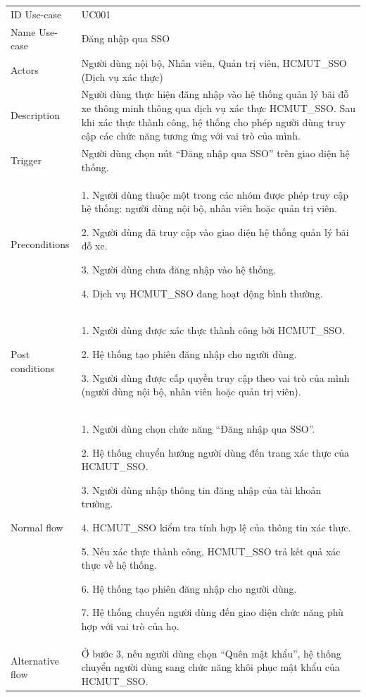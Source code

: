 \begin{center}
    \begin{tabular}{|m{2.5cm}|m{13cm}|}
    \hline
        ID Use-case  & UC001 \\ 
        Name Use-case & Đăng nhập qua SSO \\ 
    \hline
        Actors & Người dùng nội bộ, Nhân viên, Quản trị viên, HCMUT\_SSO (Dịch vụ xác thực)\\
    \hline
        Description & Người dùng thực hiện đăng nhập vào hệ thống quản lý bãi đỗ xe thông minh thông qua dịch vụ xác thực HCMUT\_SSO. Sau khi xác thực thành công, hệ thống cho phép người dùng truy cập các chức năng tương ứng với vai trò của mình. \\
    \hline
        Trigger & Người dùng chọn nút “Đăng nhập qua SSO” trên giao diện hệ thống.\\
    \hline
        Preconditions & 
        1. Người dùng thuộc một trong các nhóm được phép truy cập hệ thống: người dùng nội bộ, nhân viên hoặc quản trị viên.
        
        2. Người dùng đã truy cập vào giao diện hệ thống quản lý bãi đỗ xe.
        
        3. Người dùng chưa đăng nhập vào hệ thống.
        
        4. Dịch vụ HCMUT\_SSO đang hoạt động bình thường.\\
    \hline
        Post conditions & 
        1. Người dùng được xác thực thành công bởi HCMUT\_SSO.
        
        2. Hệ thống tạo phiên đăng nhập cho người dùng.
        
        3. Người dùng được cấp quyền truy cập theo vai trò của mình (người dùng nội bộ, nhân viên hoặc quản trị viên).\\
    \hline
        Normal flow & 
        1. Người dùng chọn chức năng “Đăng nhập qua SSO”.
        
        2. Hệ thống chuyển hướng người dùng đến trang xác thực của HCMUT\_SSO.
        
        3. Người dùng nhập thông tin đăng nhập của tài khoản trường.
        
        4. HCMUT\_SSO kiểm tra tính hợp lệ của thông tin xác thực.
        
        5. Nếu xác thực thành công, HCMUT\_SSO trả kết quả xác thực về hệ thống.
        
        6. Hệ thống tạo phiên đăng nhập cho người dùng.
        
        7. Hệ thống chuyển người dùng đến giao diện chức năng phù hợp với vai trò của họ.\\
    \hline
        Alternative flow & 
        Ở bước 3, nếu người dùng chọn “Quên mật khẩu”, hệ thống chuyển người dùng sang chức năng khôi phục mật khẩu của HCMUT\_SSO.
        

\end{tabular}
\end{center}
